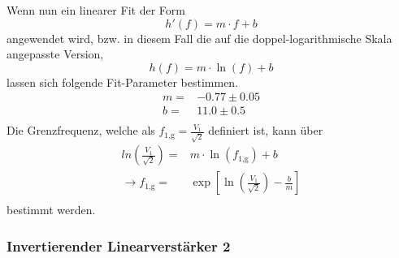 Wenn nun ein linearer Fit der Form 
\begin{equation*}
    h'(f)=m\cdot f+b
\end{equation*}
angewendet wird, bzw. in diesem Fall die auf die doppel-logarithmische Skala angepasste Version, 
\begin{equation*}
    h(f)= m \cdot \ln\left({f}\right) + b
\end{equation*}
lassen sich folgende Fit-Parameter bestimmen.
\begin{align*}
    m=&-0.77\pm 0.05 \\
    b=& 11.0\pm 0.5\\
\end{align*}
Die Grenzfrequenz, welche als $f_{1\text{,g}}=\frac{V_1}{\sqrt{2}}$ definiert ist, kann über
\begin{align*}
   ln{\left(\frac{V_1}{\sqrt{2}}\right)}=&m\cdot \ln{\left(f_{1\text{,g}}\right)}+b\\
   \rightarrow f_{1\text{,g}}=&\exp{\left[\ln{\left(\frac{V_1}{\sqrt{2}}\right)-\frac{b}{m}}\right]}\\
\end{align*}
bestimmt werden.


\subsubsection{Invertierender Linearverstärker 2}
\label{sec:InvertierenderLinearverstärker2}

